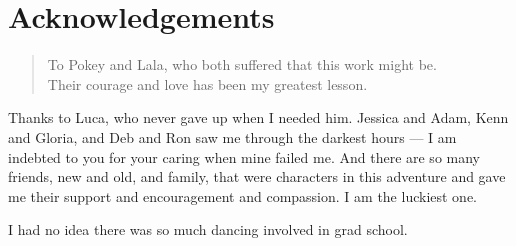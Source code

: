 \chapter{Acknowledgements}

\begin{quote}
To Pokey and Lala,
who both suffered that this work might be.\\
Their courage and love has been my greatest lesson.
\end{quote}


Thanks to Luca, who never gave up when I needed him.
Jessica and Adam, Kenn and Gloria, and Deb and Ron
saw me through the darkest hours --- I am indebted to you
for your caring when mine failed me.
And there are so many friends, new and old, and family,
that were characters in this adventure and gave me their
support and encouragement and compassion.
I am the luckiest one.

I had no idea there was so much dancing involved in grad school.

